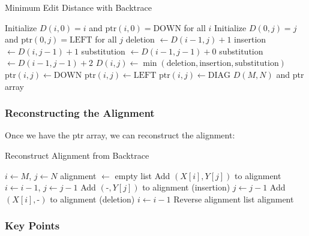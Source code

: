 \documentclass[11pt,a4paper]{article}
\theoremstyle{definition}
\theoremstyle{plain}
\theoremstyle{remark}
\begin{document}
\begin{algorithm}
\caption{Minimum Edit Distance with Backtrace}
\begin{algorithmic}
\STATE Initialize $D(i,0) = i$ and $\text{ptr}(i,0) = \text{DOWN}$ for all $i$
\STATE Initialize $D(0,j) = j$ and $\text{ptr}(0,j) = \text{LEFT}$ for all $j$
        \STATE deletion $\leftarrow D(i-1,j) + 1$
        \STATE insertion $\leftarrow D(i,j-1) + 1$
            \STATE substitution $\leftarrow D(i-1,j-1) + 0$
        \ELSE
            \STATE substitution $\leftarrow D(i-1,j-1) + 2$
        \ENDIF
        \STATE $D(i,j) \leftarrow \min(\text{deletion}, \text{insertion}, \text{substitution})$
            \STATE $\text{ptr}(i,j) \leftarrow \text{DOWN}$
            \STATE $\text{ptr}(i,j) \leftarrow \text{LEFT}$
        \ELSE
            \STATE $\text{ptr}(i,j) \leftarrow \text{DIAG}$
        \ENDIF
    \ENDFOR
\ENDFOR
\RETURN $D(M,N)$ and ptr array
\end{algorithmic}
\end{algorithm}

\subsubsection{Reconstructing the Alignment}

Once we have the ptr array, we can reconstruct the alignment:

\begin{algorithm}
\caption{Reconstruct Alignment from Backtrace}
\begin{algorithmic}
\STATE $i \leftarrow M$, $j \leftarrow N$
\STATE alignment $\leftarrow$ empty list
        \STATE Add $(X[i], Y[j])$ to alignment
        \STATE $i \leftarrow i - 1$, $j \leftarrow j - 1$
        \STATE Add $(\text{-}, Y[j])$ to alignment (insertion)
        \STATE $j \leftarrow j - 1$
    \ELSE
        \STATE Add $(X[i], \text{-})$ to alignment (deletion)
        \STATE $i \leftarrow i - 1$
    \ENDIF
\ENDWHILE
\STATE Reverse alignment list
\RETURN alignment
\end{algorithmic}
\end{algorithm}

\subsubsection{Key Points}
\end{document}
